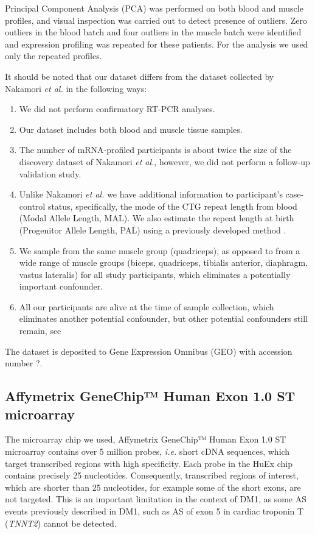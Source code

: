 \documentclass[10pt,letterpaper]{article}
\begin{document}
Principal Component Analysis (PCA) was performed on both blood and muscle profiles, and visual inspection was carried out to detect presence of outliers. Zero outliers in the blood batch and four outliers in the muscle batch were identified and expression profiling was repeated for these patients. For the analysis we used only the repeated profiles.

It should be noted that our dataset differs from the dataset collected by Nakamori {\it et al.} in the following ways:
\begin{enumerate}
\item We did not perform confirmatory RT-PCR analyses.
\item Our dataset includes both blood and muscle tissue samples.
\item The number of mRNA-profiled participants is about twice the size of the discovery dataset of Nakamori {\it et al.}, however, we did not perform a follow-up validation study.
\item Unlike Nakamori {\it et al.} we have additional information to participant's case-control status, specifically, the mode of the CTG repeat length from blood (Modal Allele Length, MAL). We also estimate the repeat length at birth (Progenitor Allele Length, PAL) using a previously developed method \cite{Morales2012}.
\item We sample from the same muscle group (quadriceps), as opposed to from a wide range of muscle groups (biceps, quadriceps, tibialis anterior, diaphragm, vastus lateralis) for all study participants, which eliminates a potentially important confounder.
\item All our participants are alive at the time of sample collection, which eliminates another potential confounder, but other potential confounders still remain, see 
\end{enumerate}

The dataset is deposited to Gene Expression Omnibus (GEO) with accession number ?.

\subsection*{Affymetrix GeneChip™ Human Exon 1.0 ST microarray}

The microarray chip we used, Affymetrix GeneChip™ Human Exon 1.0 ST microarray contains over 5 million probes, {\it i.e.} short cDNA sequences, which target transcribed regions with high specificity. Each probe in the HuEx chip contains precisely 25 nucleotides. Consequently, transcribed regions of interest, which are shorter than 25 nucleotides, for example some of the short exons, are not targeted. This is an important limitation in the context of DM1, as some AS events previously described in DM1, such as AS of exon 5 in cardiac troponin T ({\it TNNT2}) \cite{Rexiati2018} cannot be detected.
\end{document}
